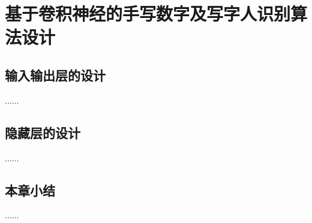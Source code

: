 \section{基于卷积神经的手写数字及写字人识别算法设计}

\subsection{输入输出层的设计}
......

\subsection{隐藏层的设计}
......

\subsection{本章小结}
......

\newpage
